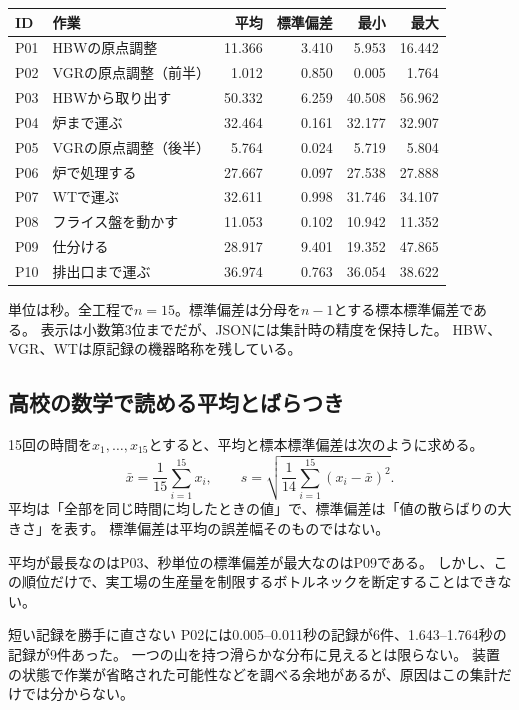 \documentclass[a4paper,11pt]{ltjsarticle}
\begin{document}
\begin{tabularx}{\linewidth}{P{10mm}Yrrrr}
\toprule ID & 作業 & 平均 & 標準偏差 & 最小 & 最大\\\midrule
P01 & HBWの原点調整 & 11.366 & 3.410 & 5.953 & 16.442\\
P02 & VGRの原点調整（前半） & 1.012 & 0.850 & 0.005 & 1.764\\
P03 & HBWから取り出す & 50.332 & 6.259 & 40.508 & 56.962\\
P04 & 炉まで運ぶ & 32.464 & 0.161 & 32.177 & 32.907\\
P05 & VGRの原点調整（後半） & 5.764 & 0.024 & 5.719 & 5.804\\
P06 & 炉で処理する & 27.667 & 0.097 & 27.538 & 27.888\\
P07 & WTで運ぶ & 32.611 & 0.998 & 31.746 & 34.107\\
P08 & フライス盤を動かす & 11.053 & 0.102 & 10.942 & 11.352\\
P09 & 仕分ける & 28.917 & 9.401 & 19.352 & 47.865\\
P10 & 排出口まで運ぶ & 36.974 & 0.763 & 36.054 & 38.622\\
\bottomrule
\end{tabularx}

\noindent 単位は秒。全工程で$n=15$。標準偏差は分母を$n-1$とする標本標準偏差である。
表示は小数第3位までだが、JSONには集計時の精度を保持した。
HBW、VGR、WTは原記録の機器略称を残している。

\subsection{高校の数学で読める平均とばらつき}
15回の時間を$x_1,\ldots,x_{15}$とすると、平均と標本標準偏差は次のように求める。
\[
\bar{x}=\frac{1}{15}\sum_{i=1}^{15}x_i,
\qquad
s=\sqrt{\frac{1}{14}\sum_{i=1}^{15}(x_i-\bar{x})^2}.
\]
平均は「全部を同じ時間に均したときの値」で、標準偏差は「値の散らばりの大きさ」を表す。
標準偏差は平均の誤差幅そのものではない。

平均が最長なのはP03、秒単位の標準偏差が最大なのはP09である。
しかし、この順位だけで、実工場の生産量を制限するボトルネックを断定することはできない。

\begin{pointbox}{短い記録を勝手に直さない}
P02には0.005--0.011秒の記録が6件、1.643--1.764秒の記録が9件あった。
一つの山を持つ滑らかな分布に見えるとは限らない。
装置の状態で作業が省略された可能性などを調べる余地があるが、原因はこの集計だけでは分からない。
\end{pointbox}
\end{document}
